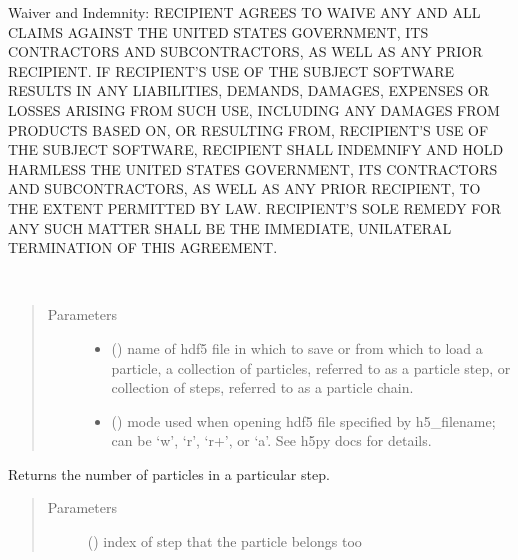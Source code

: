 \documentclass[letterpaper,10pt,english]{sphinxmanual}
\begin{document}
Waiver and Indemnity:  RECIPIENT AGREES TO WAIVE ANY AND ALL CLAIMS AGAINST THE
UNITED STATES GOVERNMENT, ITS CONTRACTORS AND SUBCONTRACTORS, AS WELL AS ANY
PRIOR RECIPIENT.  IF RECIPIENT’S USE OF THE SUBJECT SOFTWARE RESULTS IN ANY
LIABILITIES, DEMANDS, DAMAGES, EXPENSES OR LOSSES ARISING FROM SUCH USE,
INCLUDING ANY DAMAGES FROM PRODUCTS BASED ON, OR RESULTING FROM, RECIPIENT’S
USE OF THE SUBJECT SOFTWARE, RECIPIENT SHALL INDEMNIFY AND HOLD HARMLESS THE
UNITED STATES GOVERNMENT, ITS CONTRACTORS AND SUBCONTRACTORS, AS WELL AS ANY
PRIOR RECIPIENT, TO THE EXTENT PERMITTED BY LAW.  RECIPIENT’S SOLE REMEDY FOR
ANY SUCH MATTER SHALL BE THE IMMEDIATE, UNILATERAL TERMINATION OF THIS
AGREEMENT.

\begin{fulllineitems}
\label{\detokenize{source_code:smcpy.hdf5.hdf5_storage.HDF5Storage}}~\begin{quote}\begin{description}
\item[{Parameters}] \leavevmode\begin{itemize}
\item {} 
 () \textendash{} name of hdf5 file in which to save or from which
to load a particle, a collection of particles, referred to as a
particle step, or collection of steps, referred to as a particle
chain.

\item {} 
 () \textendash{} mode used when opening hdf5 file specified by h5\_filename;
can be ‘w’, ‘r’, ‘r+’, or ‘a’. See h5py docs for details.

\end{itemize}

\end{description}\end{quote}

\begin{fulllineitems}
\label{\detokenize{source_code:smcpy.hdf5.hdf5_storage.HDF5Storage.get_num_particles_in_step}}
Returns the number of particles in a particular step.
\begin{quote}\begin{description}
\item[{Parameters}] \leavevmode
{} () \textendash{} index of step that the particle belongs too


\end{description}
\end{quote}
\end{fulllineitems}
\end{fulllineitems}
\end{document}
